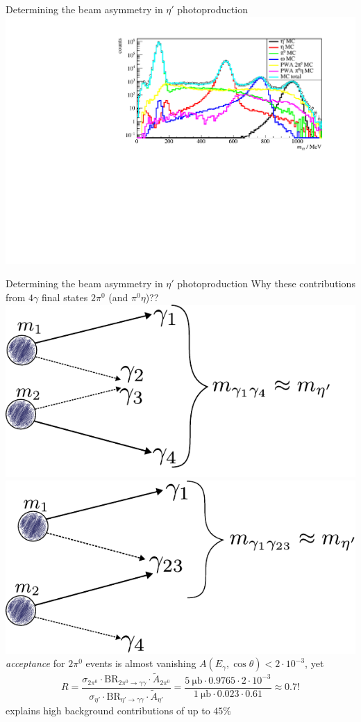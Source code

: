 \documentclass[11pt,aspectratio=169,dvipsnames]{beamer}
\begin{document}
\begin{frame}{Determining the beam asymmetry in $\eta'$ photoproduction}
	\includegraphics[width=\linewidth]{../../figs/hydrogen/invm_global.pdf}
\end{frame}
\begin{frame}{Determining the beam asymmetry in $\eta'$ photoproduction}
	Why these contributions from $4\gamma$ final states $2\pi^0$ (and $\pi^0\eta$)??
	\pause
	\includegraphics[width=.49\linewidth]{../../figs/inkscape/mcgammas1.pdf}
	\includegraphics[width=.49\linewidth]{../../figs/inkscape/mcgammas2.pdf}
	\pause
	\emph{acceptance} for $2\pi^0$ events is almost vanishing $A(E_\gamma,\cos\theta)<2\cdot10^{-3}$, yet $$R=\frac{\sigma_{2\pi^0}\cdot\text{BR}_{2\pi^0\to\gamma\gamma}\cdot\tilde{A}_{2\pi^0}}{\sigma_{\eta'}\cdot\text{BR}_{\eta'\to\gamma\gamma}\cdot\tilde{A}_{\eta'}}=\frac{\SI{5}{\micro\barn}\cdot0.9765\cdot2\cdot10^{-3}}{\SI{1}{\micro\barn}\cdot0.023\cdot0.61}\approx0.7!$$
	explains high background contributions of up to $45\%$
	\begin{flushright}
		\cites{pdg,etap_cs,2pi0_cs}
	\end{flushright}
\end{frame}
\end{document}
